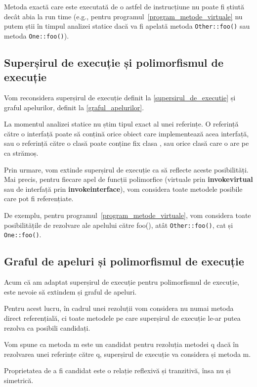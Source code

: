 Metoda exactă care este executată de o astfel de instrucțiune nu poate fi știută
decât abia la run time (e.g., pentru programul~\ref{program_metode_virtuale}
nu putem știi în timpul analizei statice dacă va fi apelată metoda
\texttt{Other::foo()} sau metoda \texttt{One::foo()}).

\subsection{Superșirul de execuție și polimorfismul de execuție}

Vom reconsidera superșirul de execuție definit la \ref{supersirul_de_executie}
și graful apelurilor, definit la \ref{graful_apelurilor}.

La momentul analizei statice nu știm tipul exact al unei referințe.
O referință către o interfață poate să conțină orice obiect care implementează
acea interfață, sau o referință către o clasă  poate conține fix clasa
, sau orice clasă care o are pe  ca strămoș.

Prin urmare, vom extinde superșirul de execuție ca să reflecte aceste
posibilități.
Mai precis, pentru fiecare apel de funcții polimorfice (virtuale prin
\textbf{invokevirtual} sau de interfață prin \textbf{invokeinterface}), vom
considera toate metodele posibile care pot fi referențiate.

De exemplu, pentru programul~\ref{program_metode_virtuale}, vom considera toate
posibilitățile de rezolvare ale apelului către foo(), atât \texttt{Other::foo()},
cat și \texttt{One::foo()}.

\subsection{Graful de apeluri și polimorfismul de execuție}

Acum că am adaptat superșirul de execuție pentru polimorfismul de execuție, este
nevoie să extindem și graful de apeluri.

Pentru acest lucru, în cadrul unei rezoluții vom considera nu numai metoda
direct referențială, ci toate metodele pe care superșirul de execuție le-ar
putea rezolva ca posibili candidați.

Vom spune ca metoda m este un candidat pentru rezoluția metodei q dacă în
rezolvarea unei referințe către q, superșirul de execuție va considera și metoda
m.

Proprietatea de a fi candidat este o relație reflexivă și tranzitivă, însa nu și
simetrică.

